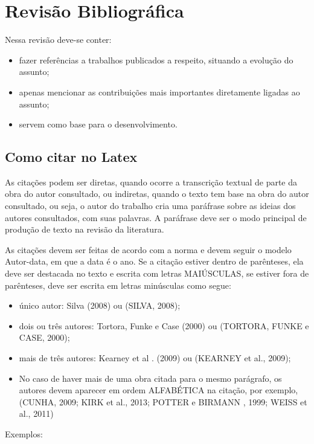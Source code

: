 \chapter{Revisão Bibliográfica}\label{cap:estArte}

Nessa revisão deve-se conter:

\begin{itemize}
    \item fazer referências a trabalhos publicados a respeito, situando a evolução do assunto;
    \item apenas mencionar as contribuições mais importantes diretamente ligadas ao assunto;
    \item servem como base para o desenvolvimento.
\end{itemize}

\section{Como citar no Latex}

As citações podem ser diretas, quando ocorre a transcrição textual de parte da obra do autor consultado, ou indiretas, quando o texto tem base na obra do autor consultado, ou seja, o autor do trabalho cria uma paráfrase sobre as ideias dos autores consultados, com suas palavras. A paráfrase deve ser o modo principal de produção de texto na revisão da literatura.

As citações devem ser feitas de acordo com a norma e devem seguir o modelo Autor-data, em que a data é o ano. Se a citação estiver dentro de parênteses, ela deve ser destacada no texto e escrita com letras MAIÚSCULAS, se estiver fora de parênteses, deve ser escrita em letras minúsculas como segue:

\begin{itemize}
    \item único autor: Silva (2008) ou (SILVA, 2008);
    \item dois ou três autores: Tortora, Funke e Case (2000) ou  (TORTORA, FUNKE e CASE, 2000);
    \item mais de três autores: Kearney et al . (2009) ou (KEARNEY et al., 2009);
    \item No caso de haver mais de uma obra citada para o mesmo parágrafo, os autores devem aparecer em ordem ALFABÉTICA na citação, por exemplo, (CUNHA, 2009; KIRK et al., 2013; POTTER e BIRMANN , 1999; WEISS et al., 2011)
\end{itemize}

Exemplos:

